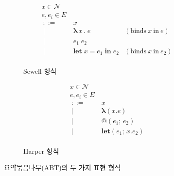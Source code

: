 \begin{figure}
\begin{subfigure}{.5\textwidth}
\begin{align*}
    x \in \mathcal{N} & \\
 e,e_i\in E ~&\\
   ~::=~& x \\
  ~\mid~& \bm{\lambda}\,x\,\bm{.}\;e
        & (\text{binds}~ x ~\text{in}~ e)\phantom{_{3}}\\
  ~\mid~& e_1\;e_2 \\
  ~\mid~& \textbf{let}\;x\pmb{=}e_1\;\textbf{in}\;e_2
        & (\text{binds}~ x ~\text{in}~ e_2)
\\[-5ex]
\end{align*}
\caption{Sewell 형식\label{sfig:ABTstyle1} }
\end{subfigure}
\hfill
\begin{subfigure}{.4\textwidth}
\begin{align*}
    x \in \mathcal{N} & \\
 e,e_i\in E ~&\\
   ~::=~& x \\
  ~\mid~& \bm{\lambda}(x.e) \\
  ~\mid~& \pmb{\textbf{@}}(e_1;\,e_2) \\
  ~\mid~& \textbf{let}(e_1;\,x.e_2)
\\[-5ex]
\end{align*}
\caption{Harper 형식\label{sfig:ABTstyle2} }
\end{subfigure}
\caption{요약묶음나무(ABT)의 두 가지 표현 형식\label{fig:ABTstyles}}
\end{figure}

